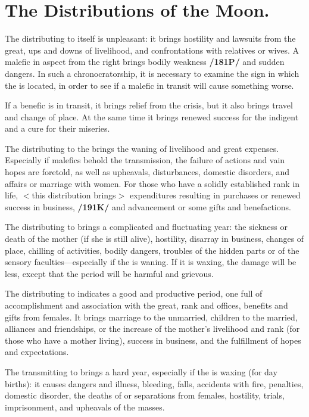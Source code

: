 \section{The Distributions of the Moon.}

The \Moon\xspace distributing to itself is unpleasant: it brings hostility and lawsuits from the great, ups and downs of livelihood, and confrontations with relatives or wives. A malefic in aspect from the right brings bodily weakness \textbf{/181P/} and sudden dangers. In such a chronocratorship, it is necessary to examine the sign in which the \Moon\xspace is located, in order to see if a malefic in transit will cause something worse. 

If a benefic is in transit, it brings relief from the crisis, but it also brings travel and change of place. At the same time it brings renewed success for the indigent and a cure for their miseries.

The \Moon\xspace distributing to the \Sun\xspace brings the waning of livelihood and great expenses. Especially if malefics behold the transmission, the failure of actions and vain hopes are foretold, as well as upheavals, disturbances, domestic disorders, and affairs or marriage with women. For those who have a solidly established rank in life, $<$this distribution brings$>$ expenditures resulting in purchases or renewed success in business, \textbf{/191K/} and advancement or some gifts and benefactions.

The \Moon\xspace distributing to \Saturn\xspace brings a complicated and fluctuating year: the sickness or death of the
mother (if she is still alive), hostility, disarray in business, changes of place, chilling of activities, bodily
dangers, troubles of the hidden parts or of the sensory faculties—especially if the \Moon\xspace is waning. If it is
waxing, the damage will be less, except that the period will be harmful and grievous.

The \Moon\xspace distributing to \Jupiter\xspace indicates a good and productive period, one full of accomplishment and association with the great, rank and offices, benefits and gifts from females. It brings marriage to the unmarried, children to the married, alliances and friendships, or the increase of the mother’s livelihood and rank (for those who have a mother living), success in business, and the fulfillment of hopes and expectations.

The \Moon\xspace transmitting to \Mars\xspace brings a hard year, especially if the \Moon\xspace is waxing (for day births): it causes dangers and illness, bleeding, falls, accidents with fire, penalties, domestic disorder, the deaths of or separations from females, hostility, trials, imprisonment, and upheavals of the masses. 

